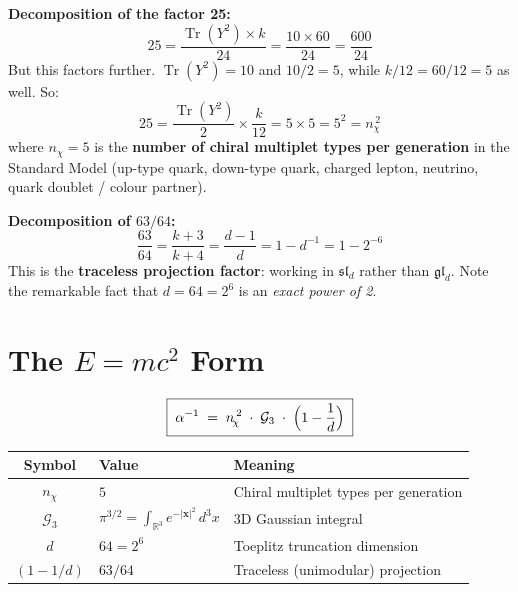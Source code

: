 \documentclass[11pt]{article}
\newcommand{\Tr}{\operatorname{Tr}}
\newcommand{\nchi}{n_{\!\chi}}
\begin{document}
\noindent
\textbf{Decomposition of the factor 25:}
\begin{equation}
25 = \frac{\Tr(Y^2) \times k}{24} = \frac{10 \times 60}{24} = \frac{600}{24}
\end{equation}
But this factors further.  $\Tr(Y^2) = 10$ and $10/2 = 5$, while
$k/12 = 60/12 = 5$ as well.  So:
\begin{equation}
25 = \frac{\Tr(Y^2)}{2} \times \frac{k}{12}
= 5 \times 5 = 5^2 = \nchi^{\,2}
\end{equation}
where $\nchi = 5$ is the \textbf{number of chiral multiplet types per
generation} in the Standard Model (up-type quark, down-type quark,
charged lepton, neutrino, quark doublet / colour partner).

\medskip\noindent
\textbf{Decomposition of $63/64$:}
\begin{equation}
\frac{63}{64} = \frac{k+3}{k+4} = \frac{d-1}{d} = 1 - d^{-1}
= 1 - 2^{-6}
\end{equation}
This is the \textbf{traceless projection factor}: working in $\mathfrak{sl}_d$
rather than $\mathfrak{gl}_d$.  Note the remarkable fact that
$d = 64 = 2^6$ is an \emph{exact power of 2}.


\section{The $E = mc^2$ Form}
\label{sec:emc2}

\begin{equation}
\boxed{\;
\alpha^{-1} \;=\; \nchi^{\,2} \;\cdot\; \mathcal{G}_3
\;\cdot\; \Bigl(1 - \frac{1}{d}\Bigr)
\;}
\label{eq:emc2-main}
\end{equation}

\bigskip
\begin{center}
\begin{tabular}{@{}cll@{}}
\toprule
\textbf{Symbol} & \textbf{Value} & \textbf{Meaning} \\
\midrule
$\nchi$ & $5$ & Chiral multiplet types per generation \\
$\mathcal{G}_3$ & $\pi^{3/2} = \displaystyle\int_{\mathbb{R}^3}
         e^{-|\mathbf{x}|^2}\,d^3x$ & 3D Gaussian integral \\
$d$ & $64 = 2^6$ & Toeplitz truncation dimension \\
$(1-1/d)$ & $63/64$ & Traceless (unimodular) projection \\
\bottomrule
\end{tabular}
\end{center}
\end{document}
